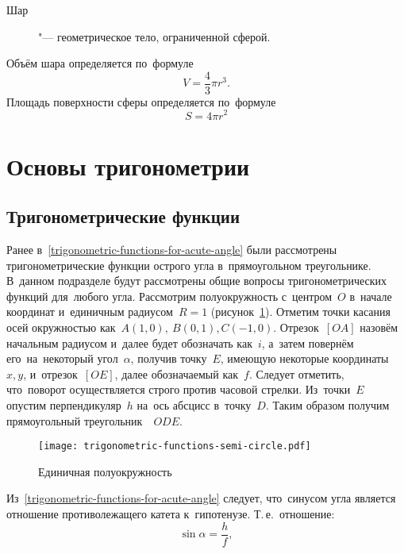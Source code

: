 \documentclass[]{scrartcl}
\begin{document}
\begin{description}
	\item[Шар] "--- геометрическое тело, ограниченной сферой.
\end{description}
Объём шара определяется по~формуле
\begin{equation}\label{eq:solid-sphere-volume}
V=\frac{4}{3}\pi r^3.
\end{equation}
Площадь поверхности сферы определяется по~формуле
\begin{equation}\label{eq:sphere-surface-square}
S=4\pi r^2
\end{equation}
%
\section{Основы тригонометрии}
%
\subsection{Тригонометрические функции}\label{trigonometric-functions}
Ранее в~\ref{trigonometric-functions-for-acute-angle} были рассмотрены тригонометрические функции острого угла в~прямоугольном треугольнике. В~данном подразделе будут рассмотрены общие вопросы тригонометрических функций для~любого угла. Рассмотрим полуокружность с~центром~${\textstyle O}$ в~начале координат и~единичным радиусом~${\textstyle R=1}$ (рисунок~\ref{fig:trigonometric-functions-semi-circle}). Отметим точки касания осей окружностью как~${\textstyle A(1,0),\ B(0,1), C(-1,0)}$. Отрезок~${\textstyle [OA]}$ назовём начальным радиусом и~далее будет обозначать как~${\textstyle i}$, а~затем повернём его~на~некоторый угол~${\textstyle \alpha}$, получив точку~${\textstyle E}$, имеющую некоторые координаты~${\textstyle x,y}$, и~отрезок~${\textstyle [OE]}$, далее обозначаемый как~${\textstyle f}$. Следует отметить, что~поворот осуществляется строго против часовой стрелки. Из~точки~${\textstyle E}$ опустим перпендикуляр~${\textstyle h}$ на~ось абсцисс в~точку~${\textstyle D}$. Таким образом получим прямоугольный треугольник~~${\textstyle ODE}$.
\begin{figure}[ht]
	\centering %
	\texttt{[image: trigonometric-functions-semi-circle.pdf]}
	\caption{Единичная полуокружность}\label{fig:trigonometric-functions-semi-circle}
\end{figure}
Из~\ref{trigonometric-functions-for-acute-angle} следует, что~синусом угла является отношение противолежащего катета к~гипотенузе. Т.\,е.~отношение:
\begin{equation}\label{eq:sinus-formula-1}
\sin \alpha = \frac{h}{f},
\end{equation} 
\end{document}
